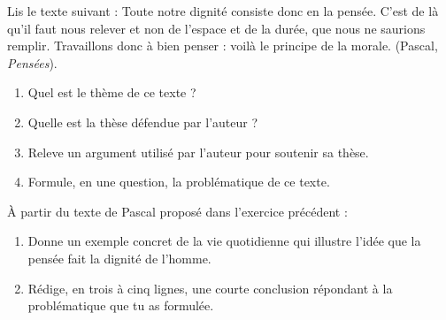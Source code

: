 \documentclass[11pt]{article}
\begin{document}
\begin{exercice}
Lis le texte suivant : \og Toute notre dignité consiste donc en la pensée. C'est de là qu'il faut nous relever et non de l'espace et de la durée, que nous ne saurions remplir. Travaillons donc à bien penser : voilà le principe de la morale. \fg{} (Pascal, \emph{Pensées}).
\begin{enumerate}
\item Quel est le thème de ce texte ?
\item Quelle est la thèse défendue par l'auteur ?
\item Releve un argument utilisé par l'auteur pour soutenir sa thèse.
\item Formule, en une question, la problématique de ce texte.
\end{enumerate}
\end{exercice}

\begin{exercice}
À partir du texte de Pascal proposé dans l'exercice précédent :
\begin{enumerate}
\item Donne un exemple concret de la vie quotidienne qui illustre l'idée que la pensée fait la dignité de l'homme.
\item Rédige, en trois à cinq lignes, une courte conclusion répondant à la problématique que tu as formulée.
\end{enumerate}
\end{exercice}
\end{document}
